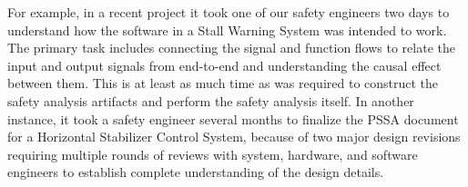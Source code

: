 For example, in a recent project it took one of our safety engineers two days to understand how the software in a Stall Warning System was intended to work. The primary task includes connecting the signal and function flows to relate the input and output signals from end-to-end and understanding the causal effect between them. This is at least as much time as was required to construct the safety analysis artifacts and perform the safety analysis itself. In another instance, it took a safety engineer several months to finalize the PSSA document for a Horizontal Stabilizer Control System, because of two major design revisions requiring multiple rounds of reviews with system, hardware, and software engineers to establish complete understanding of the design %
details.


